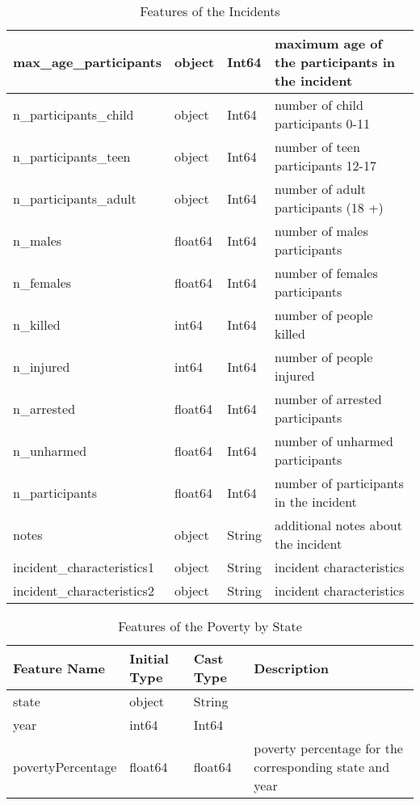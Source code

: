 \documentclass[10pt,a4paper]{report}
\begin{document}
\begin{table}
\begin{tabular}{|l|l|l|p{7cm}|}
		\hline
		max\_age\_participants & object & Int64 & maximum age of the participants in the incident\\
		\hline
		n\_participants\_child & object & Int64 & number of child participants 0-11\\
		\hline
		n\_participants\_teen & object & Int64 & number of teen participants 12-17\\
		\hline
		n\_participants\_adult & object & Int64 & number of adult participants (18 +)\\
		\hline
		n\_males & float64 & Int64 & number of males participants\\
		\hline
		n\_females & float64 & Int64 & number of females participants\\
		\hline
		n\_killed & int64 & Int64 & number of people killed\\
		\hline
		n\_injured & int64 & Int64 & number of people injured\\
		\hline
		n\_arrested & float64 & Int64 & number of arrested participants\\
		\hline
		n\_unharmed & float64 & Int64 & number of unharmed participants\\
		\hline
		n\_participants & float64 & Int64 & number of participants in the incident\\
		\hline
		notes & object & String & additional notes about the incident\\
		\hline
		incident\_characteristics1 & object & String & incident characteristics\\
		\hline
		incident\_characteristics2 & object & String & incident characteristics\\
		\hline
	\end{tabular}
	\caption{Features of the Incidents}
	\label{table01}
\end{table}

\begin{table}
	\centering
	\begin{tabular}{|l|l|l|p{7cm}|}
		\hline
		Feature Name & Initial Type & Cast Type & Description\\
		\hline
		state & object & String & \\
		\hline
		year & int64 & Int64 & \\
		\hline
		povertyPercentage & float64 & float64 & poverty percentage for the corresponding state and year\\
		\hline
	\end{tabular}
	\caption{Features of the Poverty by State}
	\label{table02}
\end{table}
\end{document}
